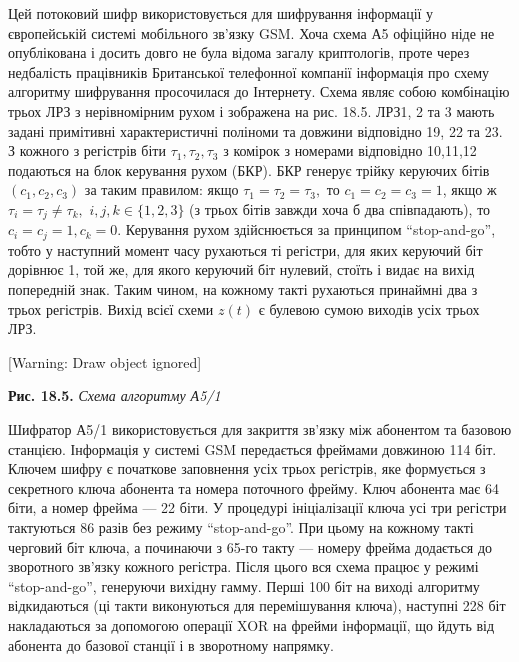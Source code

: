 Цей потоковий шифр використовується для шифрування інформації у європейській
системі мобільного зв’язку GSM.  Хоча схема А5 офіційно ніде не опублікована і
досить довго не була відома загалу криптологів, проте через недбалість
працівників Британської телефонної компанії інформація про схему алгоритму
шифрування просочилася до Інтернету. Схема являє собою комбінацію трьох ЛРЗ з
нерівномірним рухом і зображена на рис. 18.5. ЛРЗ1, 2 та 3 мають задані
примітивні характеристичні поліноми та довжини відповідно 19, 22 та 23. З
кожного з регістрів біти  ${\tau _{{1}},\tau _{{2}},\tau _{{3}}}$ з комірок з
номерами відповідно  10,11,12 подаються на блок керування рухом (БКР).  БКР 
генерує трійку керуючих бітів  ${(c_{{1}},c_{{2}},c_{{3}})}$ за таким правилом:
якщо  ${\tau _{{1}}=\tau _{{2}}=\tau _{{3}},}$ то 
${c_{{1}}=c_{{2}}=c_{{3}}=1}$, якщо ж  ${\tau _{{i}}=\tau _{{j}}\neq \tau
_{{k}},}$  ${i,j,k\in \{1,2,3\}}$ (з трьох бітів завжди хоча б два
співпадають), то  ${c_{{i}}=c_{{j}}=1,c_{{k}}=0\text{.}}$ Керування рухом
здійснюється за принципом “stop{}-and{}-go”, тобто у наступний момент часу
рухаються ті регістри, для яких керуючий біт дорівнює 1, той же, для якого
керуючий біт нулевий, стоїть і видає на вихід попередній знак. Таким чином, на
кожному такті рухаються принаймні два з трьох регістрів. Вихід всієї схеми 
${z(t)}$ є булевою сумою виходів  усіх трьох ЛРЗ.

[Warning: Draw object ignored]

{\centering
\textbf{Рис. 1}\textbf{8}\textbf{.5. }\textit{Схема алгоритму А5}\textit{/1}
\par}


\bigskip

Шифратор А5/1 використовується для закриття зв’язку між абонентом та базовою
станцією. Інформація у системі GSM передається фреймами довжиною 114 біт.
Ключем шифру є початкове заповнення усіх трьох регістрів, яке формується з
секретного ключа абонента та номера поточного фрейму. Ключ абонента має 64
біти, а номер фрейма --- 22 біти. У процедурі ініціалізації ключа усі три
регістри тактуються 86 разів без режиму “stop{}-and{}-go”. При цьому на кожному
такті черговий біт ключа, а починаючи з 65-го такту --- номеру фрейма додається
до зворотного зв’язку кожного регістра. Після цього вся схема працює у режимі
“stop{}-and{}-go”, генеруючи вихідну гамму. Перші 100 біт на виході алгоритму
відкидаються (ці такти виконуються для перемішування ключа), наступні 228 біт
накладаються за допомогою операції XOR на  фрейми інформації, що йдуть від
абонента до базової станції і в зворотному напрямку.

